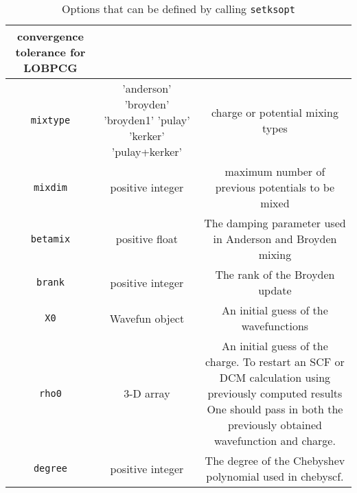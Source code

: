 \documentclass[11pt]{book}
\begin{document}
\begin{table}[htbp]
\begin{tabular}{|c|c|c|}
\begin{minipage}[t]{3in}
                                    convergence tolerance for LOBPCG
                                       \end{minipage}\\ \hline
{\tt mixtype} &  \begin{minipage}[t]{1in}
                   'anderson'    
                  'broyden'
                  'broyden1'
                  'pulay'
                  'kerker'
                  'pulay+kerker'
                \end{minipage}
& \begin{minipage}[t]{3in} 
  charge or potential mixing types
  \end{minipage}\\ \hline
{\tt mixdim} &  positive integer &  \begin{minipage}[t]{3in}
                             maximum number of previous potentials to be mixed
                                    \end{minipage}\\ \hline
{\tt betamix} & positive float   &  \begin{minipage}[t]{3in}
  The damping parameter used in Anderson and Broyden mixing
                                    \end{minipage}\\ \hline
{\tt brank} &  positive integer & \begin{minipage}[t]{3in}
                              The rank of the Broyden update
                                    \end{minipage}\\ \hline
{\tt X0} & Wavefun object & \begin{minipage}[t]{3in}
                         An initial guess of the wavefunctions
                                \end{minipage}\\ \hline
{\tt rho0} & 3-D array  & \begin{minipage}[t]{3in}
                         An initial guess of the charge.
                         To restart an SCF or DCM calculation
                         using previously computed results
                         One should pass in both the previously
                         obtained wavefunction and charge.
                                \end{minipage}\\ \hline
{\tt degree} & positive integer  & \begin{minipage}[t]{3in}
                         The degree of the Chebyshev polynomial
                         used in chebyscf.
                      \end{minipage}\\ \hline
\end{tabular}
\caption{Options that can be defined by calling {\tt setksopt}}
\label{tab:opts}
\end{table}
\end{document}
